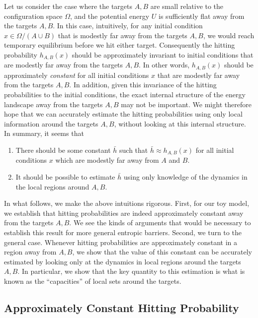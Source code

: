 \documentclass[english, aip, jcp, priprint, graphicx,floatfix]{revtex4-1}
\theoremstyle{plain}
\theoremstyle{definition}
\theoremstyle{plain}
\begin{document}
Let us consider the case where the targets $A, B$ are small relative to the configuration space $\Omega$, and the potential energy $U$ is sufficiently flat away from the targets $A, B$.  In this case, intuitively, for any initial condition $x\in \Omega / (A\cup B)$ that is modestly far away from the targets $A, B$, we would reach temporary equilibrium before we hit either target.  Consequently the hitting probability $h_{A, B}(x)$ should be approximately invariant to initial conditions that are modestly far away from the targets $A, B$.  In other words, $h_{A,B}(x)$ should be approximately \emph{constant} for all initial conditions $x$ that are modestly far away from the targets $A, B$.  In addition, given this invariance of the hitting probabilities to the initial conditions, the exact internal structure of the energy landscape away from the targets $A, B$ may not be important.  We might therefore hope that we can accurately estimate the hitting probabilities using only local information around the targets $A, B$, without looking at this internal structure. In summary, it seems that
%
\begin{enumerate}
    \item There should be some constant $\bar h$ such that $\bar h \approx h_{A,B}(x)$ for all initial conditions $x$ which are modestly far away from $A$ and $B$.
    \item It should be possible to estimate $\bar h$ using only knowledge of the dynamics in the local regions around $A,B$.  
\end{enumerate}
%
In what follows, we make the above intuitions rigorous.  First, for our toy model, we establish that hitting probabilities are indeed approximately constant away from the targets $A,B$.  We see the kinds of arguments that would be necessary to establish this result for more general entropic barriers.  Second, we turn to the general case.   Whenever hitting probabilities are approximately constant in a region away from $A,B$, we show that the value of this constant can be accurately estimated by looking only at the dynamics in local regions around the targets $A,B$.  In particular, we show that the key quantity to this estimation is what is known as the ``capacities'' of local sets around the targets. 

\subsection{Approximately Constant Hitting Probability}
\end{document}
